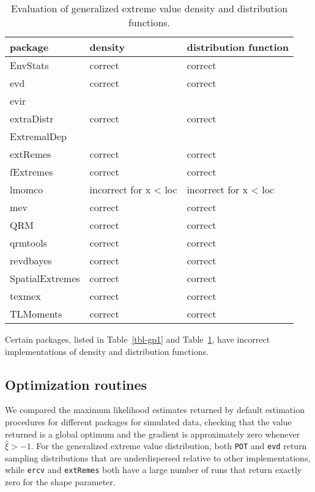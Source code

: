 \documentclass[
  letterpaper,
  DIV=11,
  numbers=noendperiod]{scrartcl}
\begin{document}
\hypertarget{tbl-gev1}{}
\begin{table}
\caption{\label{tbl-gev1}Evaluation of generalized extreme value density and distribution
functions. }\tabularnewline

\centering
\begin{tabular}{lll}
\toprule
package & density & distribution function\\
\midrule
EnvStats & correct & correct\\
evd & correct & correct\\
evir &  & \\
extraDistr & correct & correct\\
ExtremalDep &  & \\
\addlinespace
extRemes & correct & correct\\
fExtremes & correct & correct\\
lmomco & incorrect for x < loc & incorrect for x < loc\\
mev & correct & correct\\
QRM & correct & correct\\
\addlinespace
qrmtools & correct & correct\\
revdbayes & correct & correct\\
SpatialExtremes & correct & correct\\
texmex & correct & correct\\
TLMoments & correct & correct\\
\bottomrule
\end{tabular}
\end{table}

Certain packages, listed in Table~\ref{tbl-gp1} and
Table~\ref{tbl-gev1}, have incorrect implementations of density and
distribution functions.

\hypertarget{optimization-routines}{%
\subsection{Optimization routines}\label{optimization-routines}}

We compared the maximum likelihood estimates returned by default
estimation procedures for different packages for simulated data,
checking that the value returned is a global optimum and the gradient is
approximately zero whenever \(\widehat{\xi} > -1\). For the generalized
extreme value distribution, both \texttt{POT} and \texttt{evd} return
sampling distributions that are underdispersed relative to other
implementations, while \texttt{ercv} and \texttt{extRemes} both have a
large number of runs that return exactly zero for the shape parameter.
\end{document}
